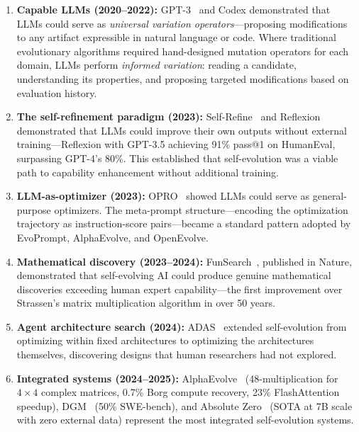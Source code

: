 \begin{enumerate}
    \item \textbf{Capable LLMs (2020--2022):} GPT-3~\citep{brown2020gpt3} and Codex demonstrated that LLMs could serve as \emph{universal variation operators}---proposing modifications to any artifact expressible in natural language or code. Where traditional evolutionary algorithms required hand-designed mutation operators for each domain, LLMs perform \emph{informed variation}: reading a candidate, understanding its properties, and proposing targeted modifications based on evaluation history.

    \item \textbf{The self-refinement paradigm (2023):} Self-Refine~\citep{madaan2023selfrefine} and Reflexion~\citep{shinn2023reflexion} demonstrated that LLMs could improve their own outputs without external training---Reflexion with GPT-3.5 achieving 91\% pass@1 on HumanEval, surpassing GPT-4's 80\%. This established that self-evolution was a viable path to capability enhancement without additional training.

    \item \textbf{LLM-as-optimizer (2023):} OPRO~\citep{yang2023opro} showed LLMs could serve as general-purpose optimizers. The meta-prompt structure---encoding the optimization trajectory as instruction-score pairs---became a standard pattern adopted by EvoPrompt, AlphaEvolve, and OpenEvolve.

    \item \textbf{Mathematical discovery (2023--2024):} FunSearch~\citep{romera2024funsearch}, published in Nature, demonstrated that self-evolving AI could produce genuine mathematical discoveries exceeding human expert capability---the first improvement over Strassen's matrix multiplication algorithm in over 50 years.

    \item \textbf{Agent architecture search (2024):} ADAS~\citep{hu2024adas} extended self-evolution from optimizing within fixed architectures to optimizing the architectures themselves, discovering designs that human researchers had not explored.

    \item \textbf{Integrated systems (2024--2025):} AlphaEvolve~\citep{novikov2025alphaevolve} (48-multiplication for $4\times4$ complex matrices, 0.7\% Borg compute recovery, 23\% FlashAttention speedup), DGM~\citep{zhang2025dgm} (50\% SWE-bench), and Absolute Zero~\citep{zhao2025absolutezero} (SOTA at 7B scale with zero external data) represent the most integrated self-evolution systems.
\end{enumerate}

